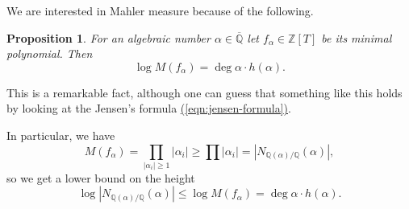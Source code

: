 \documentclass{article}
\newcommand{\eqnref}[1]{\hyperref[#1]{(\ref*{#1})}}
\newtheorem{proposition}{Proposition}[section]
\theoremstyle{definition}
\newcommand{\ZZ}{\mathbb{Z}}
\newcommand{\QQ}{\mathbb{Q}}
\begin{document}

We are interested in Mahler measure because of the following.

\begin{proposition}
  For an algebraic number $\alpha \in \overline{\QQ}$ let $f_\alpha \in \ZZ [T]$
  be its minimal polynomial. Then
  $$\log M (f_\alpha) = \deg \alpha \cdot h (\alpha).$$
\end{proposition}

This is a remarkable fact, although one can guess that something like this holds
by looking at the Jensen's formula \eqnref{eqn:jensen-formula}.

In particular, we have
$$M (f_\alpha) = \prod_{|\alpha_i| \ge 1} |\alpha_i| \ge \prod |\alpha_i| = |N_{\QQ (\alpha)/\QQ} (\alpha)|,$$
so we get a lower bound on the height
\begin{equation}
  \label{eqn:lower-bound-on-the-height}
  \log |N_{\QQ (\alpha) / \QQ} (\alpha)| \le \log M (f_\alpha) = \deg \alpha \cdot h (\alpha).
\end{equation}
\end{document}
